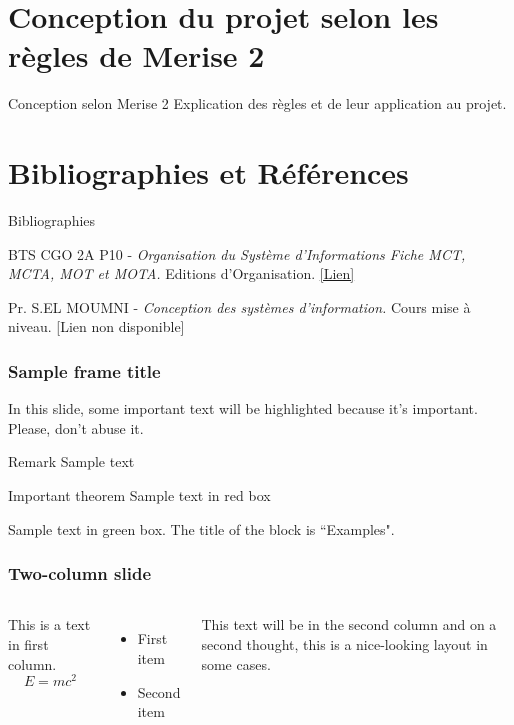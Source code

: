 \documentclass{beamer}
\begin{document}
\section{Conception du projet selon les règles de Merise 2}
\begin{frame}{Conception selon Merise 2}
    Explication des règles et de leur application au projet.
\end{frame}

\section{Bibliographies et Références}
\begin{frame}{Bibliographies}
\begin{thebibliography}{9}

BTS CGO 2A P10 -\textit{ Organisation du Système d’Informations Fiche MCT, MCTA, MOT et MOTA.} Editions d'Organisation. 
\href{https://example.com/merise}{[Lien]} 

Pr. S.EL MOUMNI -\textit{ Conception des systèmes d’information.} Cours mise à niveau. 
\alert{[Lien non disponible]}

\end{thebibliography}
\end{frame}

\begin{frame}
\frametitle{Sample frame title}

In this slide, some important text will be
\alert{highlighted} because it's important.
Please, don't abuse it.

\begin{block}{Remark}
Sample text
\end{block}

\begin{alertblock}{Important theorem}
Sample text in red box
\end{alertblock}

\begin{examples}
Sample text in green box. The title of the block is ``Examples".
\end{examples}
\end{frame}



\begin{frame}
\frametitle{Two-column slide}

\begin{columns}

This is a text in first column.
$$E=mc^2$$
\begin{itemize}
\item First item
\item Second item
\end{itemize}

This text will be in the second column
and on a second thought, this is a nice-looking
layout in some cases.
\end{columns}
\end{frame}
\end{document}

